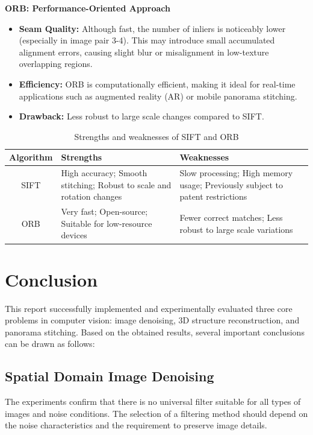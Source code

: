 \documentclass[a4paper,12pt]{article}
\begin{document}
\textbf{ORB: Performance-Oriented Approach}
\begin{itemize}
    \item \textbf{Seam Quality:} Although fast, the number of inliers is noticeably lower (especially in image pair 3-4). This may introduce small accumulated alignment errors, causing slight blur or misalignment in low-texture overlapping regions.
    \item \textbf{Efficiency:} ORB is computationally efficient, making it ideal for real-time applications such as augmented reality (AR) or mobile panorama stitching.
    \item \textbf{Drawback:} Less robust to large scale changes compared to SIFT.
\end{itemize}


\begin{table}[h]
\centering
\begin{tabular}{|c|p{5cm}|p{5cm}|}
\hline
\textbf{Algorithm} & \textbf{Strengths} & \textbf{Weaknesses} \\ \hline
SIFT & High accuracy; Smooth stitching; Robust to scale and rotation changes & Slow processing; High memory usage; Previously subject to patent restrictions \\ \hline
ORB & Very fast; Open-source; Suitable for low-resource devices & Fewer correct matches; Less robust to large scale variations \\ \hline
\end{tabular}
\caption{Strengths and weaknesses of SIFT and ORB}
\end{table}

\section{Conclusion}


This report successfully implemented and experimentally evaluated three core problems in computer vision: image denoising, 3D structure reconstruction, and panorama stitching. Based on the obtained results, several important conclusions can be drawn as follows:

\subsection{Spatial Domain Image Denoising}
The experiments confirm that there is no universal filter suitable for all types of images and noise conditions. The selection of a filtering method should depend on the noise characteristics and the requirement to preserve image details.
\end{document}
